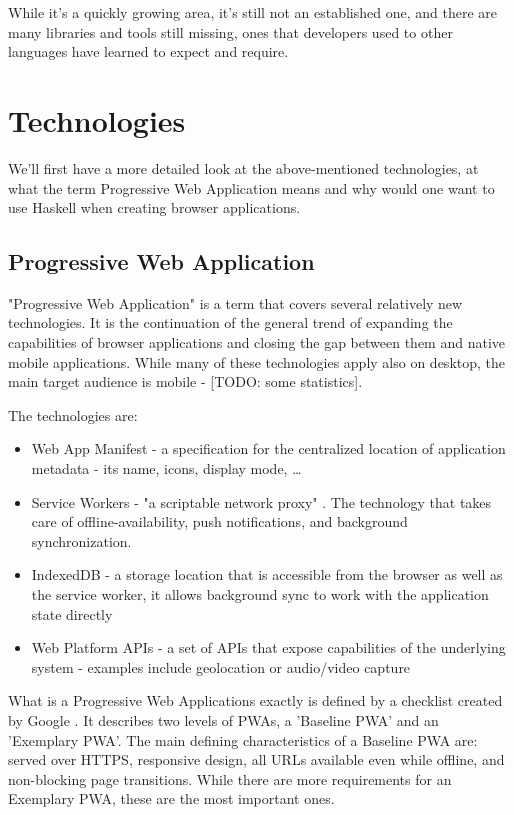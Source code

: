 \documentclass[english,odsaz]{fitthesis}
\begin{document}
While it's a quickly growing area, it's still not an established one, and there
are many libraries and tools still missing, ones that developers used to other
languages have learned to expect and require.

\chapter{Technologies}
\label{sec:org7c8fa64}
We'll first have a more detailed look at the above-mentioned technologies, at
what the term Progressive Web Application means and why would one want to use
Haskell when creating browser applications.

\section{Progressive Web Application}
\label{sec:orge78a7aa}
"Progressive Web Application" is a term that covers several relatively new
technologies. It is the continuation of the general trend of expanding the
capabilities of browser applications and closing the gap between them and native
mobile applications. While many of these technologies apply also on desktop, the
main target audience is mobile - [TODO: some statistics].

The technologies are:
\begin{itemize}
\item Web App Manifest - a specification for the centralized location of application
metadata - its name, icons, display mode, \ldots{}
\item Service Workers - "a scriptable network proxy" \cite{mdn_svcwrk}. The
technology that takes care of offline-availability, push notifications, and
background synchronization.
\item IndexedDB - a storage location that is accessible from the browser as well as
the service worker, it allows background sync to work with the application
state directly
\item Web Platform APIs - a set of APIs that expose capabilities of the underlying
system - examples include geolocation or
audio/video capture \cite{what_web_can_do}
\end{itemize}

What is a Progressive Web Applications exactly is defined by a checklist created
by Google \cite{pwa_checklist}. It describes two levels of PWAs, a 'Baseline PWA'
and an 'Exemplary PWA'. The main defining characteristics of a Baseline PWA are:
served over HTTPS, responsive design, all URLs available even while offline, and
non-blocking page transitions. While there are more requirements for an
Exemplary PWA, these are the most important ones.
\end{document}

